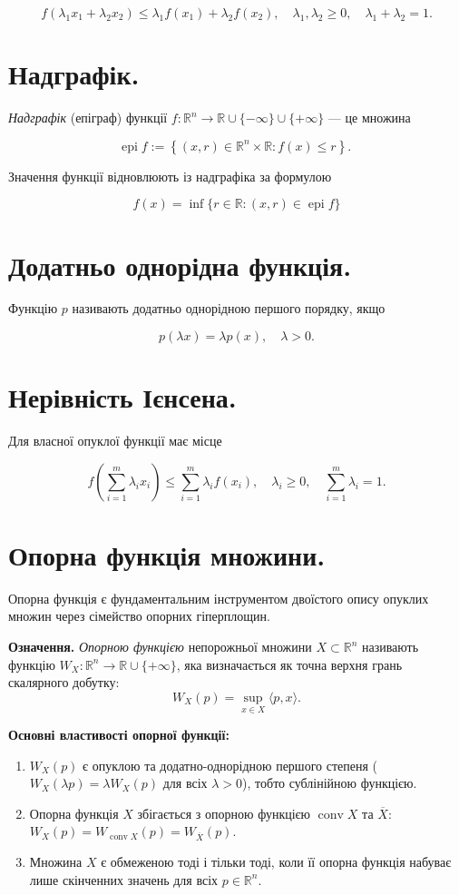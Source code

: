 \documentclass[12pt,a4paper]{extarticle}
\numberwithin{section}{part}
\begin{document}
$$
f\left(\lambda_{1} x_{1}+\lambda_{2} x_{2}\right) \leq \lambda_{1} f\left(x_{1}\right)+\lambda_{2} f\left(x_{2}\right), \quad \lambda_{1}, \lambda_{2} \geq 0, \quad \lambda_{1}+\lambda_{2}=1 .
$$

\section{Надграфік.}
\textit{Надграфік} (епіграф) функції $f: \mathbb{R}^{n} \rightarrow \mathbb{R} \cup\{-\infty\} \cup\{+\infty\}$ --- це множина

$$
\operatorname{epi} f:=\left\{(x, r) \in \mathbb{R}^{n} \times \mathbb{R}: f(x) \leq r\right\} \text {. }
$$

Значення функції відновлюють із надграфіка за формулою

$$
f(x)=\inf \{r \in \mathbb{R}:(x, r) \in \operatorname{epi} f\}
$$

\section{Додатньо однорідна функція.}
Функцію $p$ називають додатньо однорідною першого порядку, якщо

$$
p(\lambda x)=\lambda p(x), \quad \lambda>0 .
$$

\section{Нерівність Ієнсена.}
Для власної опуклої функції має місце

$$
f\left(\sum_{i=1}^{m} \lambda_{i} x_{i}\right) \leq \sum_{i=1}^{m} \lambda_{i} f\left(x_{i}\right), \quad \lambda_{i} \geq 0, \quad \sum_{i=1}^{m} \lambda_{i}=1 .
$$

\section{Опорна функція множини.}
Опорна функція є фундаментальним інструментом двоїстого опису опуклих множин через сімейство опорних гіперплощин.

\textbf{Означення.} \textit{Опорною функцією} непорожньої множини $X \subset \mathbb{R}^n$ називають функцію $W_X : \mathbb{R}^n \to \mathbb{R} \cup \{+\infty\}$, яка визначається як точна верхня грань скалярного добутку:
$$
W_X(p) = \sup_{x \in X} \langle p, x \rangle.
$$

\textbf{Основні властивості опорної функції:}
\begin{enumerate}
    \item $W_X(p)$ є опуклою та додатно-однорідною першого степеня ($W_X(\lambda p) = \lambda W_X(p)$ для всіх $\lambda > 0$), тобто сублінійною функцією.
    \item Опорна функція $X$ збігається з опорною функцією $\operatorname{conv} X$ та $\overline{X}$: $W_X(p) = W_{\operatorname{conv} X}(p) = W_{\overline{X}}(p)$.
    \item Множина $X$ є обмеженою тоді і тільки тоді, коли її опорна функція набуває лише скінченних значень для всіх $p \in \mathbb{R}^n$.
\end{enumerate}
\end{document}
